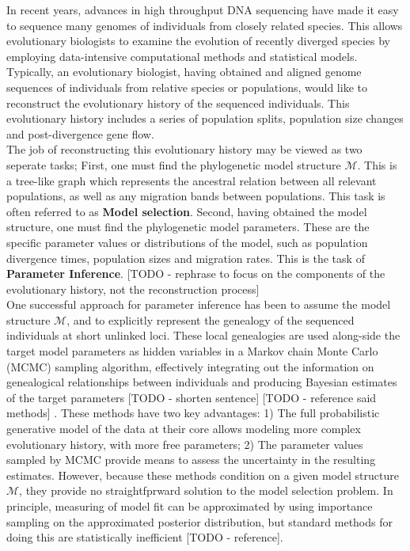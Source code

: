 \documentclass[11pt]{article}
\newcommand{\M}{\mathcal{M}}
\newcommand{\1}{\mathbbm{1}}
\begin{document}
In recent years, advances in high throughput DNA sequencing have made it easy to sequence many genomes of individuals from closely related species. This allows evolutionary biologists to examine the evolution of recently diverged species by employing data-intensive computational methods and statistical models.
%
Typically, an evolutionary biologist, having obtained and aligned genome sequences of individuals from relative species or populations, would like to reconstruct the evolutionary history of the sequenced individuals. This evolutionary history includes a series of population splits, population size changes and post-divergence gene flow.\\
%
The job of reconstructing this evolutionary history may be viewed as two seperate tasks; First, one must find the phylogenetic model structure $\M$. This is a tree-like graph which represents the ancestral relation between all relevant populations, as well as any migration bands between populations. This task is often referred to as \textbf{Model selection}. Second, having obtained the model structure, one must find the phylogenetic model parameters. These are the specific parameter values or distributions of the model, such as population divergence times, population sizes and migration rates. This is the task of \textbf{Parameter Inference}. [TODO - rephrase to focus on the components of the evolutionary history, not the reconstruction process]\\
%
One successful approach for parameter inference has been to assume the model structure $\M$, and to explicitly represent the genealogy of the sequenced individuals at short unlinked loci. These local genealogies are used along-side the target model parameters as hidden variables in a Markov chain Monte Carlo (MCMC) sampling algorithm, effectively integrating out the information on genealogical relationships between individuals and producing Bayesian estimates of the target parameters [TODO - shorten sentence] [TODO - reference said methods] .
%
These methods have two key advantages: 1) The full probabilistic generative model of the data at their core allows modeling more complex evolutionary history, with more free parameters; 2) The parameter values sampled by MCMC provide means to assess the uncertainty in the resulting estimates.
%
However, because these methods condition on a given model structure $\M$, they provide no straightfprward solution to the model selection problem.
%
In principle, measuring of model fit can be approximated by using importance sampling on the approximated posterior distribution, but standard methods for doing this are statistically inefficient [TODO - reference].
\end{document}
